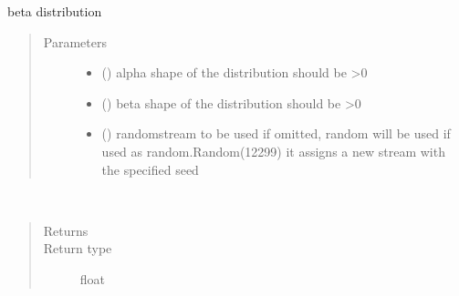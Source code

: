 \documentclass[letterpaper,10pt,english]{sphinxmanual}
\begin{document}
\begin{fulllineitems}
\label{\detokenize{Reference:salabim.Beta}}
beta distribution
\begin{quote}\begin{description}
\item[{Parameters}] \leavevmode\begin{itemize}
\item {} 
 () \textendash{} alpha shape of the distribution 
should be \textgreater{}0

\item {} 
 () \textendash{} beta shape of the distribution 
should be \textgreater{}0

\item {} 
 () \textendash{} randomstream to be used 
if omitted, random will be used 
if used as random.Random(12299)
it assigns a new stream with the specified seed

\end{itemize}

\end{description}\end{quote}

\begin{fulllineitems}
\label{\detokenize{Reference:salabim.Beta.mean}}~\begin{quote}\begin{description}
\item[{Returns}] \leavevmode
{}

\item[{Return type}] \leavevmode
float

\end{description}\end{quote}

\end{fulllineitems}



\end{fulllineitems}
\end{document}
